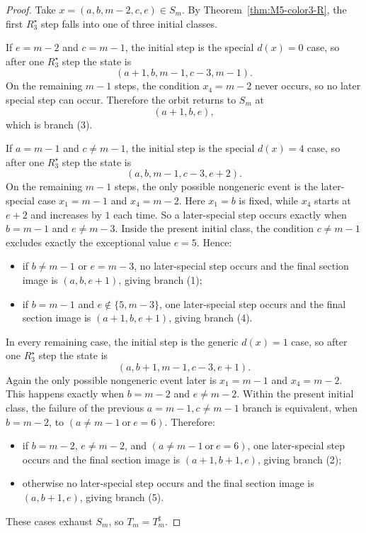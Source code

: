 \documentclass[11pt]{article}
\newcommand{\Ssec}{S_m}
\newcommand{\Tsharp}{T_m^{\sharp}}
\begin{document}
\begin{proof}
Take \(x=(a,b,m-2,c,e)\in \Ssec\).
By Theorem~\ref{thm:M5-color3-R}, the first \(R_3^\star\) step falls into one
of three initial classes.

If \(e=m-2\) and \(c=m-1\), the initial step is the special \(d(x)=0\) case, so
after one \(R_3^\star\) step the state is
\[
(a+1,b,m-1,c-3,m-1).
\]
On the remaining \(m-1\) steps, the condition \(x_4=m-2\) never occurs, so no
later special step can occur.  Therefore the orbit returns to \(\Ssec\) at
\[
(a+1,b,e),
\]
which is branch \textup{(3)}.

If \(a=m-1\) and \(c\neq m-1\), the initial step is the special \(d(x)=4\)
case, so after one \(R_3^\star\) step the state is
\[
(a,b,m-1,c-3,e+2).
\]
On the remaining \(m-1\) steps, the only possible nongeneric event is the
later-special case \(x_1=m-1\) and \(x_4=m-2\).  Here \(x_1=b\) is fixed, while
\(x_4\) starts at \(e+2\) and increases by \(1\) each time.  So a later-special
step occurs exactly when \(b=m-1\) and \(e\neq m-3\).  Inside the present
initial class, the condition \(c\neq m-1\) excludes exactly the exceptional
value \(e=5\).  Hence:
\begin{itemize}[leftmargin=2.4em]
\item if \(b\neq m-1\) or \(e=m-3\), no later-special step occurs and the final
      section image is \((a,b,e+1)\), giving branch \textup{(1)};
\item if \(b=m-1\) and \(e\notin\{5,m-3\}\), one later-special step occurs and
      the final section image is \((a+1,b,e+1)\), giving branch \textup{(4)}.
\end{itemize}

In every remaining case, the initial step is the generic \(d(x)=1\) case, so
after one \(R_3^\star\) step the state is
\[
(a,b+1,m-1,c-3,e+1).
\]
Again the only possible nongeneric event later is \(x_1=m-1\) and \(x_4=m-2\).
This happens exactly when \(b=m-2\) and \(e\neq m-2\).  Within the present
initial class, the failure of the previous \(a=m-1,c\neq m-1\) branch is
equivalent, when \(b=m-2\), to \((a\neq m-1\ \text{or}\ e=6)\).  Therefore:
\begin{itemize}[leftmargin=2.4em]
\item if \(b=m-2\), \(e\neq m-2\), and \((a\neq m-1\ \text{or}\ e=6)\), one
      later-special step occurs and the final section image is
      \((a+1,b+1,e)\), giving branch \textup{(2)};
\item otherwise no later-special step occurs and the final section image is
      \((a,b+1,e)\), giving branch \textup{(5)}.
\end{itemize}

These cases exhaust \(\Ssec\), so \(T_m=\Tsharp\).
\end{proof}
\end{document}
